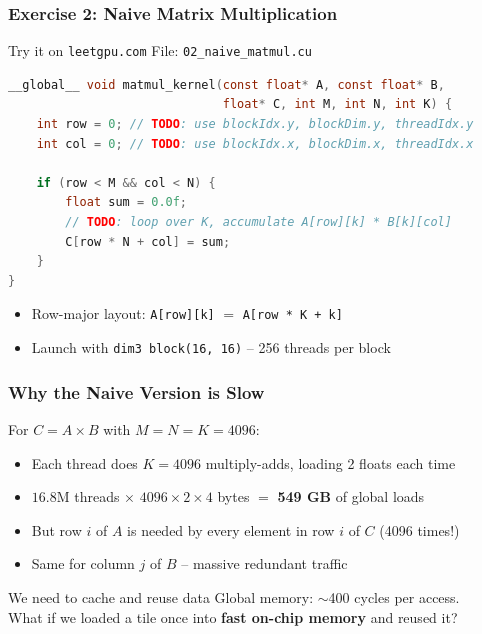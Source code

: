 \documentclass[aspectratio=169]{beamer}
\begin{document}
\begin{frame}[fragile]
	\frametitle{Exercise 2: Naive Matrix Multiplication}
	\begin{block}{Try it on \texttt{leetgpu.com}}
		File: \texttt{02\_naive\_matmul.cu}
	\end{block}
	\vspace{0.3em}
	\begin{lstlisting}[language=C]
__global__ void matmul_kernel(const float* A, const float* B,
                              float* C, int M, int N, int K) {
    int row = 0; // TODO: use blockIdx.y, blockDim.y, threadIdx.y
    int col = 0; // TODO: use blockIdx.x, blockDim.x, threadIdx.x

    if (row < M && col < N) {
        float sum = 0.0f;
        // TODO: loop over K, accumulate A[row][k] * B[k][col]
        C[row * N + col] = sum;
    }
}
	\end{lstlisting}
	\vspace{0.3em}
	\begin{itemize}
		\item Row-major layout: \texttt{A[row][k]} $=$ \texttt{A[row * K + k]}
		\item Launch with \texttt{dim3 block(16, 16)} -- 256 threads per block
	\end{itemize}
\end{frame}

\begin{frame}
	\frametitle{Why the Naive Version is Slow}
	For $C = A \times B$ with $M = N = K = 4096$:
	\vspace{0.5em}
	\begin{itemize}
		\item Each thread does $K = 4096$ multiply-adds, loading 2 floats each time
		\item $16.8$M threads $\times$ $4096 \times 2 \times 4$ bytes $=$ \textbf{549 GB} of global loads
		\item But row $i$ of $A$ is needed by every element in row $i$ of $C$ (4096 times!)
		\item Same for column $j$ of $B$ -- massive redundant traffic
	\end{itemize}
	\vspace{0.5em}
	\begin{alertblock}{We need to cache and reuse data}
		Global memory: $\sim$400 cycles per access. \\
		What if we loaded a tile once into \textbf{fast on-chip memory} and reused it?
	\end{alertblock}
\end{frame}
\end{document}
